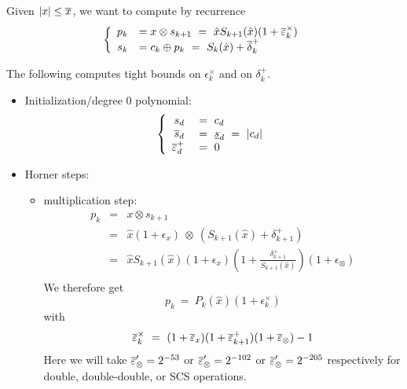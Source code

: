 Given $ |x| \leq {\overline{x}}$, we want to compute by recurrence
  $$ \left\{
    \begin{array}{rl}
      p_{k}  &= x \otimes s_{k+1}
             \ = \ \hat{x}S_{k+1}(\hat{x}) (1+{\overline{\varepsilon}}^\times_k)\\
      s_{k}  &=  c_k \oplus p_k
             \ = \ S_{k}(\hat{x}) + {\overline{\delta}}^+_k\\
      \end{array}
  \right.
  $$


The following computes tight bounds on $\epsilon^\times_k$ and on $\delta^+_k$.

\begin{itemize}
\item Initialization/degree 0 polynomial: 
  $$ \left\{
    \begin{array}{rl}
      s_d & \ = \ c_d\\
      \overline{s}_{d} & \ = \ \underline{s}_{d} \ = \ |c_d|\\
      {\overline{\varepsilon}}^+_d &\ = \ 0\\
    \end{array}
  \right.
  $$


\item Horner steps: 
  \begin{itemize}
  \item multiplication step:%
    \begin{eqnarray*}
      p_{k}  &=& x \otimes s_{k+1} \\
             &=& \hat{x}(1+\epsilon_x)\ \otimes \ (S_{k+1}(\hat{x}) + \delta^+_{k+1})\\
             &=& \hat{x} S_{k+1}(\hat{x})(1+\epsilon_x)(1 + \frac{\delta^+_{k+1}}{S_{k+1}(\hat{x})})(1+\epsilon_\otimes)\\
    \end{eqnarray*}
    We therefore get 
    \begin{equation}
      p_{k} \ = \ P_{k}(\hat{x})(1+\epsilon^\times_k)\label{eq:pk}
    \end{equation}
    with 
    \begin{equation}
      {\overline{\varepsilon}}^\times_k \ = \ (1+{\overline{\varepsilon}}_x)(1 + {\overline{\varepsilon}}^+_{k+1})(1+{\overline{\varepsilon}}_\otimes) - 1 \label{eq:maxepsp}
    \end{equation}
    Here we will take ${\overline{\varepsilon}}'_\otimes = 2^{-53}$ or
    ${\overline{\varepsilon}}'_\otimes = 2^{-102}$ or ${\overline{\varepsilon}}'_\otimes = 2^{-205}$
    respectively for double, double-double, or SCS operations.
    

\end{itemize}
\end{itemize}
